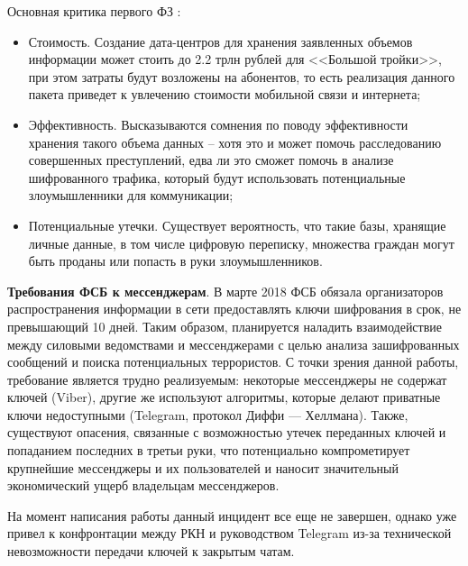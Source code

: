 	Основная критика первого ФЗ :
	\begin{itemize}
		\item Стоимость. Создание дата-центров для хранения заявленных объемов информации может стоить до 2.2 трлн рублей для <<Большой тройки>>, при этом затраты будут возложены на абонентов, то есть реализация данного пакета приведет  к увлечению стоимости мобильной  связи и интернета; \cite{Yar1} %
		\item Эффективность. Высказываются сомнения по поводу эффективности хранения такого объема данных -- хотя это и может помочь расследованию совершенных преступлений, едва ли это сможет помочь в анализе шифрованного трафика, который будут использовать потенциальные злоумышленники для коммуникации;
		\item Потенциальные утечки. Существует  вероятность, что такие базы, хранящие личные данные, в том числе цифровую переписку, множества граждан могут быть проданы или попасть в руки злоумышленников.    
	\end{itemize}
	
	
	\textbf{Требования ФСБ к мессенджерам}. В марте 2018 ФСБ обязала организаторов распространения информации в сети предоставлять ключи шифрования в срок, не превышающий 10 дней. %
	Таким образом, планируется наладить взаимодействие между силовыми ведомствами и мессенджерами  с целью анализа зашифрованных сообщений и поиска потенциальных террористов. С точки зрения данной работы, требование является трудно реализуемым: некоторые мессенджеры  не содержат ключей (Viber), другие же используют алгоритмы, которые делают приватные ключи недоступными (Telegram, протокол Диффи — Хеллмана). \cite{Yar2} %
	Также, существуют опасения, связанные с возможностью утечек переданных ключей  и попаданием последних в третьи руки, что потенциально компрометирует крупнейшие мессенджеры и их пользователей и наносит значительный экономический ущерб владельцам мессенджеров.
	
	На момент написания работы данный инцидент все еще не завершен, однако уже привел к конфронтации между РКН и руководством Telegram из-за технической невозможности передачи ключей к закрытым чатам. 
\newpage
